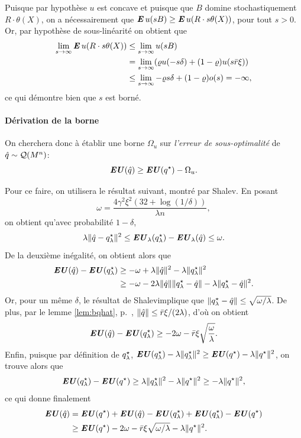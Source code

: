   Puisque par hypothèse $u$ est concave et puisque que $B$ domine stochastiquement
  $R\cdot \theta(X)$, on a nécessairement que $\E u(sB) \geq \E u(R\cdot s\theta(X))$, pour tout
  $s > 0$. Or, par hypothèse de sous-linéarité on obtient que
  \begin{align}
    \lim_{s\to\infty}\E u(R\cdot s\theta(X)) &\leq \lim_{s\to\infty}u(sB)\\
                             & = \lim_{s\to\infty}(\varrho u(-s\delta) + (1-\varrho)u(s\rmax\xi))\\
                             & \leq\lim_{s\to\infty}-\varrho s \delta + (1-\varrho)o(s) = -\infty,
  \end{align}
  ce qui démontre bien que $s$ est borné.

\paragraph{Dérivation de la borne}

On cherchera donc à établir une borne $\Omega_u$ sur \textit{l'erreur de sous-optimalité} de
$\hat q \sim \alg(M^n)$:
\begin{equation}
  \EU(\qh) \geq \EU(\qs) - \Omega_u.
\end{equation}

Pour ce faire, on utilisera le résultat suivant, montré par \cit Shalev. En posant
\begin{equation}
  \omega = \frac{4\gamma^2\xi^2(32 + \log(1/\delta))}{\lambda n},
\end{equation}
on obtient qu'avec probabilité $1-\delta$, 
\begin{equation}
\lambda\nq{\qh-\qsl}^2 \leq \EU_\lambda(\qsl)- \EU_\lambda(\qh) \leq \omega.
\end{equation}
De la deuxième inégalité, on obtient alors que
\begin{align}
  \EU(\qh) - \EU(\qsl) & \geq -\omega + \lambda\nq{\qh}^2  -\lambda\nq{\qsl}^2\\
                       & \geq -\omega -2\lambda\nq{\qh}\nq{\qsl-\qh} - \lambda\nq{\qsl-\qh}^2.
\end{align}
Or, pour un même $\delta$, le résultat de Shalev\cit implique que $\nq{\qsl-\qh} \leq
\sqrt{\omega/\lambda}$. De plus, par le lemme \ref{lem:bqhat}, p.~\pageref{lem:bqhat}, $\nq{\qh}\leq
\rmax\xi/(2\lambda)$, d'où on obtient
\begin{equation}
  \EU(\qh) - \EU(\qsl) \geq -2\omega -\rmax\xi\sqrt{\frac{\omega}{\lambda}}.
\end{equation}
Enfin, puisque par définition de $\qsl$, $\EU(\qsl) - \lambda\nq{\qsl}^2 \geq \EU(\qs) -
\lambda\nq{\qs}^2$, on trouve alors que
\begin{equation}
  \EU(\qsl) - \EU(\qs) \geq \lambda\nq{\qsl}^2 - \lambda\nq{\qs}^2 \geq -\lambda\nq{\qs}^2,
\end{equation}
ce qui donne finalement
\begin{align}
  \EU(\qh) &= \EU(\qs) + \EU(\qh) - \EU(\qsl) + \EU(\qsl) - \EU(\qs)\\
           & \geq \EU(\qs) - 2\omega - \rmax\xi\sqrt{\omega/\lambda} - \lambda\nq{\qs}^2.
\end{align}

